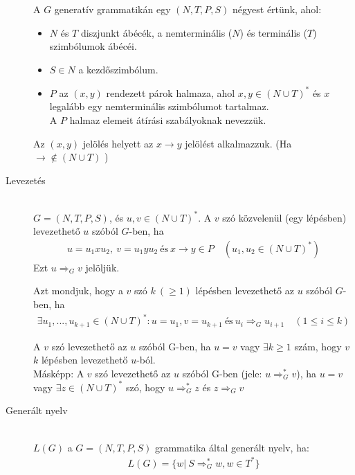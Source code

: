 \documentclass[margin=0px]{article}
\begin{document}
\begin{description}
        A $G$ generatív grammatikán egy $(N,T,P,S)$ négyest értünk, ahol:
        \begin{itemize}
            \item $N$ és $T$ diszjunkt ábécék, a nemterminális ($N$) és terminális ($T$) szimbólumok ábécéi.
            \item $S\in N$ a kezdőszimbólum.
            \item $P$ az $(x,y)$ rendezett párok halmaza, ahol $x,y \in (N \cup T)^*$ és $x$ legalább egy nemterminális szimbólumot tartalmaz. \\
                  A $P$ halmaz elemeit átírási szabályoknak nevezzük.
        \end{itemize}
        Az $(x,y)$ jelölés helyett az $x \rightarrow y$ jelölést alkalmazzuk. (Ha $\rightarrow \notin (N\cup T)$ )
    \item[Levezetés] \hfill \\
        $ G = (N,T,P,S) $, és $u,v \in (N\cup T)^*$. A $v$ szó közvelenül (egy lépésben) levezethető $u$ szóból $G$-ben, ha
        \begin{align*}
            u = u_1xu_2, \ v = u_1yu_2 \ \textrm{és} \ x \rightarrow y \in P \quad (u_1, u_2 \in (N \cup T)^*)
        \end{align*}
        Ezt $ u \Longrightarrow_G v$ jelöljük.

        Azt mondjuk, hogy a $v$ szó $k \ (\geq 1)$ lépésben levezethető az $u$ szóból $G$-ben, ha
        \begin{align*}
            \exists u_1, ... , u_{k+1} \in (N\cup T)^*: u = u_1, v = u_{k+1} \ \textrm{és} \ u_i \Longrightarrow_G u_{i+1} \quad (1 \leq i \leq k)
        \end{align*}

        A $v$ szó levezethető az $u$ szóból G-ben, ha $u=v$ vagy $\exists k \geq 1$ szám, hogy $v$ $k$ lépésben levezethető $u$-ból.\\
        Másképp: A $v$ szó levezethető az $u$ szóból G-ben (jele: $ u \Longrightarrow_G^* v $), ha $u=v$ vagy $\exists z \in  (N\cup T)^*$ szó, hogy $ u \Longrightarrow_G^* z $ és $ z \Longrightarrow_G v $
    \item[Generált nyelv] \hfill \\
        $L(G)$ a $G=(N,T,P,S)$ grammatika által generált nyelv, ha:
        \begin{align*}
            L(G) = \{w | \ S \Longrightarrow_G^* w, w \in T^*\}
        \end{align*}
\end{description}
\end{document}
